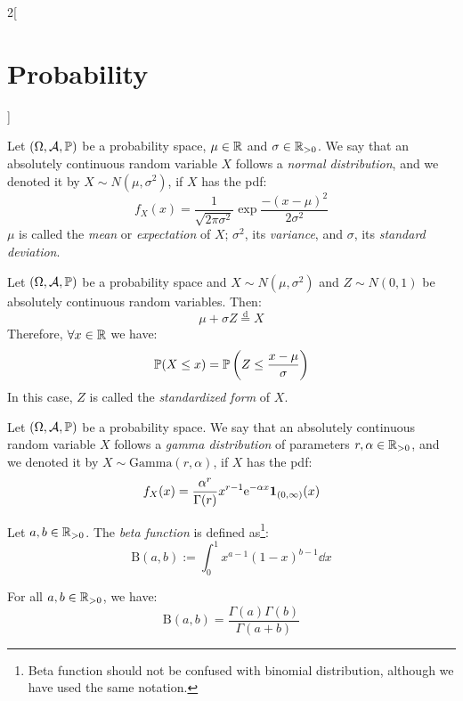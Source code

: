 \documentclass[../../../main.tex]{subfiles}
\begin{document}
\begin{multicols}{2}[\section{Probability}]
\begin{definition}
        Let $(\Omega,\mathcal{A},\mathbb{P})$ be a probability space, $\mu\in\mathbb{R}$ and $\sigma\in\mathbb{R}_{>0}$. We say that an absolutely continuous random variable $X$ follows a \textit{normal distribution}, and we denoted it by $X\sim N(\mu,\sigma^2)$, if $X$ has the pdf: $$f_X(x)=\frac{1}{\sqrt{2\pi\sigma^2}}\exp{\frac{-{(x-\mu)}^2}{2\sigma^2}}$$ $\mu$ is called the \textit{mean} or \textit{expectation} of $X$; $\sigma^2$, its \textit{variance}, and $\sigma$, its \textit{standard deviation}.
    \end{definition}
    \begin{center}
        \begin{minipage}{\linewidth}
            \centering
            
        \end{minipage}
    \end{center}
    \begin{prop}
        Let $(\Omega,\mathcal{A},\mathbb{P})$ be a probability space and $X\sim N(\mu,\sigma^2)$ and $Z\sim N(0,1)$ be absolutely continuous random variables. Then: $$\mu+\sigma Z\overset{\text{d}}{=} X$$ Therefore, $\forall x\in\mathbb{R}$ we have: $$\mathbb{P}(X\leq x)=\mathbb{P}\left(Z\leq\frac{x-\mu}{\sigma}\right)$$ In this case, $Z$ is called the \textit{standardized form} of $X$.
    \end{prop}
    \begin{definition}
        Let $(\Omega,\mathcal{A},\mathbb{P})$ be a probability space. We say that an absolutely continuous random variable $X$ follows a \textit{gamma distribution} of parameters $r,\alpha\in\mathbb{R}_{>0}$, and we denoted it by $X\sim \text{Gamma}(r,\alpha)$, if $X$ has the pdf: $$f_X(x)=\frac{\alpha^r}{\Gamma(r)}x^{r-1}\mathrm{e}^{-\alpha x}\boldsymbol{\mathrm{1}}_{(0,\infty)}(x)$$
    \end{definition}
    \begin{definition}
        Let $a,b\in\mathbb{R}_{>0}$. The \textit{beta function} is defined as\footnote{Beta function should not be confused with binomial distribution, although we have used the same notation.}: $$\text{B}(a,b):=\int_0^1x^{a-1}{(1-x)}^{b-1}\dd x$$
    \end{definition}
    \begin{prop}
        For all $a,b\in\mathbb{R}_{>0}$, we have: $$\text{B}(a,b)=\frac{\Gamma(a)\Gamma(b)}{\Gamma(a+b)}$$
    \end{prop}
    \begin{definition}

\end{definition}
\end{multicols}
\end{document}

